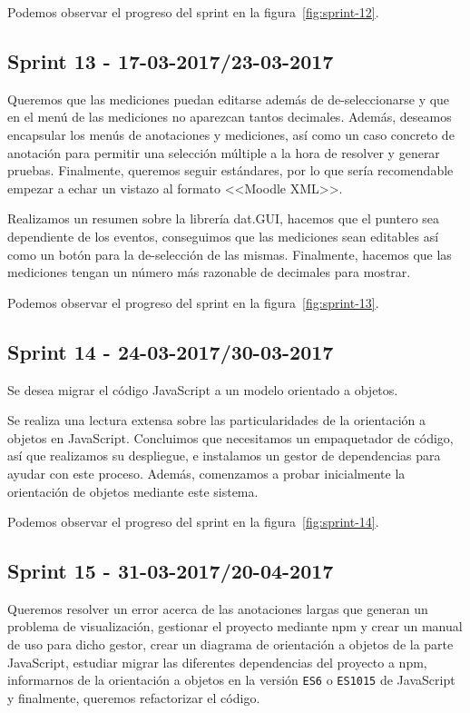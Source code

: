 Podemos observar el progreso del sprint en la figura~\ref{fig:sprint-12}.

\subsection{Sprint 13 - 17-03-2017/23-03-2017}
Queremos que las mediciones puedan editarse además de de-seleccionarse y que en el menú de las mediciones no aparezcan tantos decimales.
Además, deseamos encapsular los menús de anotaciones y mediciones, así como un caso concreto de anotación para permitir una selección múltiple a la hora de resolver y generar pruebas.
Finalmente, queremos seguir estándares, por lo que sería recomendable empezar a echar un vistazo al formato <<Moodle XML>>.

Realizamos un resumen sobre la librería dat.GUI, hacemos que el puntero sea dependiente de los eventos, conseguimos que las mediciones sean editables así como un botón para la de-selección de las mismas. Finalmente, hacemos que las mediciones tengan un número más razonable de decimales para mostrar.

Podemos observar el progreso del sprint en la figura~\ref{fig:sprint-13}.

\subsection{Sprint 14 - 24-03-2017/30-03-2017}
Se desea migrar el código JavaScript a un modelo orientado a objetos.

Se realiza una lectura extensa sobre las particularidades de la orientación a objetos en JavaScript. Concluimos que necesitamos un empaquetador de código, así que realizamos su despliegue, e instalamos un gestor de dependencias para ayudar con este proceso. Además, comenzamos a probar inicialmente la orientación de objetos mediante este sistema.

Podemos observar el progreso del sprint en la figura~\ref{fig:sprint-14}.

\subsection{Sprint 15 - 31-03-2017/20-04-2017}
Queremos resolver un error acerca de las anotaciones largas que generan un problema de visualización, gestionar el proyecto mediante npm y crear un manual de uso para dicho gestor, crear un diagrama de orientación a objetos de la parte JavaScript, estudiar migrar las diferentes dependencias del proyecto a npm, informarnos de la orientación a objetos en la versión \texttt{ES6} o \texttt{ES1015} de JavaScript y finalmente, queremos refactorizar el código.

